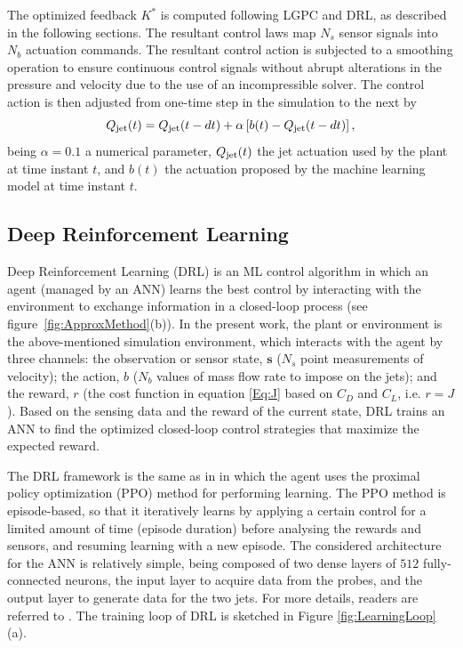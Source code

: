The optimized feedback ${K}^{*}$ is computed following LGPC and DRL, as described in the following sections. The resultant control laws map $N_s$ sensor signals into $N_b$ actuation commands.
The resultant control action is subjected to a smoothing operation to ensure continuous control signals without abrupt alterations in the pressure and velocity due to the use of an incompressible solver. The control action is then adjusted from one-time step in the simulation to the next by
\begin{equation}\label{eq:Qsmooth}
    Q_{\rm jet}(t)=Q_{\rm jet}(t-dt)+\alpha\left[{b}(t)-Q_{\rm jet}(t-dt)\right],
\end{equation}
being $\alpha=0.1$ a numerical parameter, $Q_{\rm jet}(t)$ the jet actuation used by the plant at time instant $t$, and ${b}(t)$ the actuation proposed by the machine learning model at time instant $t$. 

\subsection{Deep Reinforcement Learning}

Deep Reinforcement Learning (DRL) is an ML control algorithm in which an agent (managed by an ANN) learns the best control by interacting with the environment to exchange information in a closed-loop process (see figure~\ref{fig:ApproxMethod}(b)). In the present work, the plant or environment is the above-mentioned simulation environment, which interacts with the agent by three channels: the observation or sensor state, $\bm{s}$ ($N_s$ point measurements of velocity); the action, $b$ ($N_b$ values of mass flow rate to impose on the jets); and the reward, $r$ (the cost function in equation \ref{Eq:J} based on $C_D$ and $C_L$, i.e. $r=J$). Based on the sensing data and the reward of the current state, DRL trains an ANN to find the optimized closed-loop control strategies that maximize the expected reward.

The DRL framework is the same as in \citet{rabault2019JFM} in which the agent uses the proximal policy optimization (PPO) method \citep{schulman_proximal_2017} for performing learning. The PPO method is episode-based, so that it iteratively learns by applying a certain control for a limited amount of time (episode duration) before analysing the rewards and sensors, and resuming learning with a new episode. The considered architecture for the ANN is relatively simple, being composed of two dense layers of $512$ fully-connected neurons, the input layer to acquire data from the probes, and the output layer to generate data for the two jets. For more details, readers are referred to \citet{rabault2019JFM}. The training loop of DRL is sketched in Figure \ref{fig:LearningLoop}(a).

